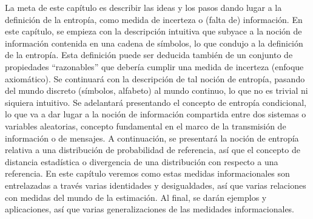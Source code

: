 La meta de este  cap\'itulo es describir las ideas y los  pasos dando lugar a la
definici\'on  de  la   entrop\'ia,  como  medida  de  incerteza   o  (falta  de)
informaci\'on.  En  este cap\'itulo, se  empieza con la  descripci\'on intuitiva
que  subyace  a  la  noci\'on  de  informaci\'on  contenida  en  una  cadena  de
s\'imbolos,  lo  que   condujo  a  la  definici\'on  de   la  entrop\'ia.   Esta
definici\'on  puede  ser  deducida  tambi\'en  de  un  conjunto  de  propiedades
``razonables''  que   deber\'ia  cumplir   una  medida  de   incerteza  (enfoque
axiom\'atico).   Se  continuar\'a  con  la  descripci\'on  de  tal  noci\'on  de
entrop\'ia, pasando del mundo discreto (s\'imbolos, alfabeto) al mundo continuo,
lo  que no es  trivial ni  siquiera intuitivo.   Se adelantar\'a  presentando el
concepto  de entrop\'ia condicional,  lo que  va a  dar lugar  a la  noci\'on de
informaci\'on  compartida entre  dos sistemas  o variables  aleatorias, concepto
fundamental en  el marco de la  transmisi\'on de informaci\'on o  de mensajes. A
continuaci\'on,  se  presentar\'a  la  noci\'on  de entrop\'ia  relativa  a  una
distribuci\'on de probabilidad de referencia, as\'i que el concepto de distancia
estad\'istica  o   divergencia  de  una   distribuci\'on  con  respecto   a  una
referencia. En  este cap\'itulo veremos  como estas medidas  informacionales son
entrelazadas  a trav\'es varias  identidades y  desigualdades, as\'i  que varias
relaciones  con medidas  del  mundo de  la  estimaci\'on. Al  final, se  dar\'an
ejemplos  y aplicaciones,  as\'i que  varias generalizaciones  de  las medidades
informacionales.
